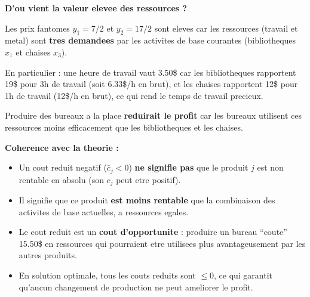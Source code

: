 \documentclass[12pt,a4paper]{article}
\begin{document}
\begin{correction}
\begin{astuce}
\textbf{D'ou vient la valeur elevee des ressources ?}

Les prix fantomes $y_1 = 7/2$ et $y_2 = 17/2$ sont eleves car les ressources (travail et metal) sont \textbf{tres demandees} par les activites de base courantes (bibliotheques $x_1$ et chaises $x_3$).

En particulier : une heure de travail vaut 3.50\$ car les bibliotheques rapportent 19\$ pour 3h de travail (soit 6.33\$/h en brut), et les chaises rapportent 12\$ pour 1h de travail (12\$/h en brut), ce qui rend le temps de travail precieux.

Produire des bureaux a la place \textbf{reduirait le profit} car les bureaux utilisent ces ressources moins efficacement que les bibliotheques et les chaises.
\end{astuce}

\textbf{Coherence avec la theorie :}

\begin{itemize}
    \item Un cout reduit negatif ($\bar{c}_j < 0$) \textcolor{importantrouge}{\textbf{ne signifie pas}} que le produit $j$ est non rentable en absolu (son $c_j$ peut etre positif).
    
    \item Il signifie que ce produit \textcolor{importantrouge}{\textbf{est moins rentable}} que la combinaison des activites de base actuelles, a ressources egales.
    
    \item Le cout reduit est un \textbf{cout d'opportunite} : produire un bureau ``coute'' 15.50\$ en ressources qui pourraient etre utilisees plus avantageusement par les autres produits.
    
    \item En solution optimale, tous les couts reduits sont $\leq 0$, ce qui garantit qu'aucun changement de production ne peut ameliorer le profit.
\end{itemize}
\end{correction}
\end{document}
